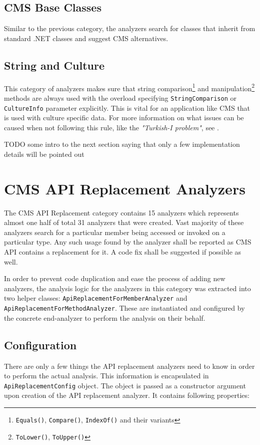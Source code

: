 \documentclass[
  digital, %
  table,   %
  lof,     %
  lot,     %
  oneside,
]{fithesis3}
\begin{document}
\subsection{CMS Base Classes}
Similar to the previous category, the analyzers search for classes that inherit from standard .NET classes and suggest CMS alternatives.

\subsection{String and Culture}
This category of analyzers makes sure that string comparison\footnote{\texttt{Equals()}, \texttt{Compare()}, \texttt{IndexOf()} and their variants} and manipulation\footnote{\texttt{ToLower()}, \texttt{ToUpper()}} methods are always used with the overload specifying \texttt{StringComparison} or \texttt{CultureInfo} parameter explicitly. This is vital for an application like CMS that is used with culture specific data. For more information on what issues can be caused when not following this rule, like the \textit{"Turkish-I problem"}, see \cite{best-practices-for-using-strings-in-dot-net}. 

\bigskip\noindent
TODO some intro to the next section saying that only a few implementation details will be pointed out

\section{CMS API Replacement Analyzers}
The CMS API Replacement category contains 15 analyzers which represents almost one half of total 31 analyzers that were created. Vast majority of these analyzers search for a particular member being accessed or invoked on a particular type. Any such usage found by the analyzer shall be reported as CMS API contains a replacement for it. A code fix shall be suggested if possible as well.

In order to prevent code duplication and ease the process of adding new analyzers, the analysis logic for the analyzers in this category was extracted into two helper classes: \texttt{ApiReplacementForMemberAnalyzer} and \texttt{ApiReplacementForMethodAnalyzer}. These are instantiated and configured by the concrete end-analyzer to perform the analysis on their behalf.

\subsection{Configuration}
There are only a few things the API replacement analyzers need to know in order to perform the actual analysis. This information is encapsulated in \texttt{ApiReplacementConfig} object. The object is passed as a constructor argument upon creation of the API replacement analyzer. It contains following properties:
\end{document}
